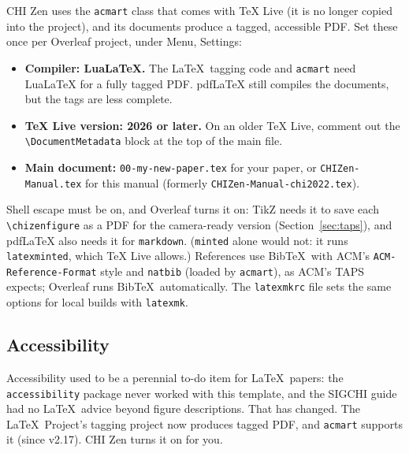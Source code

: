 CHI Zen uses the \texttt{acmart} class that comes with TeX Live (it is no longer copied into the project), and its documents produce a tagged, accessible PDF. Set these once per Overleaf project, under Menu, Settings:
\begin{itemize}
    \item \textbf{Compiler: LuaLaTeX.} The \LaTeX\ tagging code and \texttt{acmart} need LuaLaTeX for a fully tagged PDF. pdfLaTeX still compiles the documents, but the tags are less complete.
    \item \textbf{TeX Live version: 2026 or later.} On an older TeX Live, comment out the \texttt{\textbackslash DocumentMetadata} block at the top of the main file.
    \item \textbf{Main document:} \texttt{00-my-new-paper.tex} for your paper, or \texttt{CHIZen-Manual.tex} for this manual (formerly \texttt{CHIZen-Manual-chi2022.tex}).
\end{itemize}
Shell escape must be on, and Overleaf turns it on: TikZ needs it to save each \texttt{\textbackslash chizenfigure} as a PDF for the camera-ready version (Section~\ref{sec:taps}), and pdfLaTeX also needs it for \texttt{markdown}. (\texttt{minted} alone would not: it runs \texttt{latexminted}, which TeX Live allows.) References use Bib\TeX\ with ACM's \texttt{ACM-Reference-Format} style and \texttt{natbib} (loaded by \texttt{acmart}), as ACM's TAPS expects; Overleaf runs Bib\TeX\ automatically. The \texttt{latexmkrc} file sets the same options for local builds with \texttt{latexmk}.

\subsection{Accessibility}
\label{sec:accessibility}

Accessibility used to be a perennial to-do item for \LaTeX\ papers: the \texttt{accessibility} package never worked with this template, and the SIGCHI guide had no \LaTeX\ advice beyond figure descriptions. That has changed. The \LaTeX\ Project's tagging project now produces tagged PDF, and \texttt{acmart} supports it (since v2.17). CHI Zen turns it on for you.

